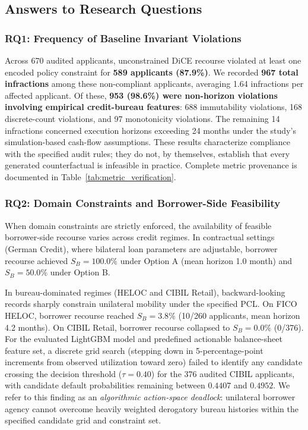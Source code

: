 \documentclass[manuscript,screen,review,anonymous]{acmart}
\begin{document}
\subsection{Answers to Research Questions}

\subsubsection{RQ1: Frequency of Baseline Invariant Violations}
Across 670 audited applicants, unconstrained DiCE recourse violated at least one encoded policy constraint for \textbf{589 applicants (87.9\%)}. We recorded \textbf{967 total infractions} among these non-compliant applicants, averaging 1.64 infractions per affected applicant. Of these, \textbf{953 (98.6\%) were non-horizon violations involving empirical credit-bureau features}: 688 immutability violations, 168 discrete-count violations, and 97 monotonicity violations. The remaining 14 infractions concerned execution horizons exceeding 24 months under the study's simulation-based cash-flow assumptions. These results characterize compliance with the specified audit rules; they do not, by themselves, establish that every generated counterfactual is infeasible in practice. Complete metric provenance is documented in Table~\ref{tab:metric_verification}.

\subsubsection{RQ2: Domain Constraints and Borrower-Side Feasibility}
When domain constraints are strictly enforced, the availability of feasible borrower-side recourse varies across credit regimes. In contractual settings (German Credit), where bilateral loan parameters are adjustable, borrower recourse achieved $S_B = 100.0\%$ under Option A (mean horizon 1.0 month) and $S_B = 50.0\%$ under Option B.

In bureau-dominated regimes (HELOC and CIBIL Retail), backward-looking records sharply constrain unilateral mobility under the specified PCL. On FICO HELOC, borrower recourse reached $S_B = 3.8\%$ (10/260 applicants, mean horizon 4.2 months). On CIBIL Retail, borrower recourse collapsed to $S_B = 0.0\%$ (0/376). For the evaluated LightGBM model and predefined actionable balance-sheet feature set, a discrete grid search (stepping down in 5-percentage-point increments from observed utilization toward zero) failed to identify any candidate crossing the decision threshold ($\tau = 0.40$) for the 376 audited CIBIL applicants, with candidate default probabilities remaining between $0.4407$ and $0.4952$. We refer to this finding as an \emph{algorithmic action-space deadlock}: unilateral borrower agency cannot overcome heavily weighted derogatory bureau histories within the specified candidate grid and constraint set.
\end{document}
